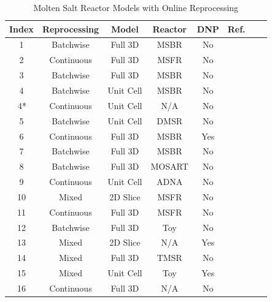 \begin{table}[H]
\renewcommand{\arraystretch}{1.25}
\caption{Molten Salt Reactor Models with Online Reprocessing}
\label{tab:codes_types}
\begin{center}
\begin{tabular}{ | c | c | c | c | c | c | c | c | }
 \hline
 Index & Reprocessing & Model & Reactor & DNP & Ref.\\
 \hline
 \hline
 1 & Batchwise & Full 3D & MSBR & No & \cite{rykhlevskii_modeling_2019}\\
 2 & Continuous & Full 3D & MSFR & No & \cite{aufiero_extended_2013}\\
 3 & Batchwise & Full 3D & MSBR & No & \cite{park_whole_2015}\\
 4 & Batchwise & Unit Cell & MSBR & No & \cite{betzler_molten_2017}\\
 \;\,4* & Continuous & Unit Cell & N/A & No & \cite{jr_vicente_valdez_modeling_2020}\\
 5 & Batchwise & Unit Cell & DMSR & No &  \cite{ahmad_neutronics_2015}\\
 6 & Continuous & Full 3D & MSBR & Yes & \cite{zhou_fuel_2018}\\
 7 & Batchwise & Full 3D & MSBR & No & \cite{nuttin_potential_2005}\\
 8 & Batchwise & Full 3D & MOSART & No & \cite{sheu_depletion_2013}\\
 9 & Continuous & Unit Cell & ADNA & No & \cite{rodriguez-vieitez_transmutation_2002}\\
 10 & Mixed & 2D Slice & MSFR & No & \cite{fiorina_preliminary_2012}\\
 11 & Continuous & Full 3D & MSFR & No & \cite{zhuang_extended_2020}\\
 12 & Batchwise & Full 3D & Toy & No & \cite{ridley_method_2017}\\
 13 & Mixed & 2D Slice & N/A & Yes & \cite{h_f_bauman_rod_1971}\\
 14 & Mixed & Full 3D & TMSR & No & \cite{merle-lucotte_thorium_2007}\\
 15 & Mixed & Unit Cell & Toy & Yes & \cite{nagy_parametric_2008}\\
 16 & Continuous & Full 3D & N/A & No & \cite{xia_development_2019}\\
 \hline
\end{tabular}
\end{center}
\end{table}


